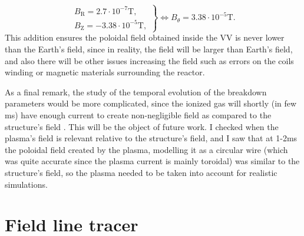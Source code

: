 \documentclass[a4paper,12pt,oneside]{book}
\begin{document}
\begin{equation}
\left.
\begin{array}{c}
B_\text{R}=2.7 \cdot 10^{-7}\text{T}, \\
B_\text{Z}=-3.38 \cdot 10^{-5}\text{T},
\end{array}
\right\}
\Leftrightarrow B_\theta=3.38 \cdot 10^{-5}\text{T}.
\end{equation}
%
This addition ensures the poloidal field obtained inside the VV is never lower than the Earth's field, since in reality, the field will be larger than Earth's field, and also there will be other issues increasing the field such as errors on the coils winding or magnetic materials surrounding the reactor.

As a final remark, the study of the temporal evolution of the breakdown parameters would be more complicated, since the ionized gas will shortly (in few ms) have enough current to create non-negligible field as compared to the structure's field
. This will be the object of future work. I checked when the plasma's field is relevant relative to the structure's field, and I saw that at 1-2ms the poloidal field created by the plasma, modelling it as a circular wire (which was quite accurate since the plasma current is mainly toroidal) was similar to the structure's field, so the plasma needed to be taken into account for realistic simulations.

\section{Field line tracer}
\end{document}
